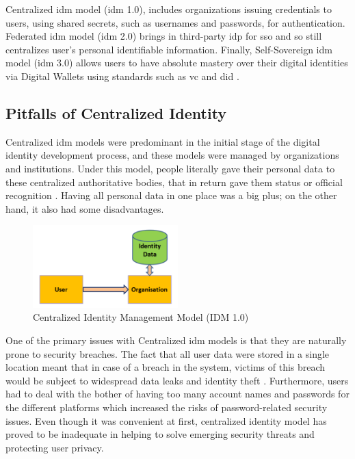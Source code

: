 Centralized \gls{idm} model (\gls{idm} 1.0), includes organizations issuing credentials to users, using shared secrets, such as usernames and passwords, for authentication. 
Federated \gls{idm} model (\gls{idm} 2.0) brings in third-party \gls{idp} for \gls{sso} and so still centralizes user's personal identifiable information. Finally, 
Self-Sovereign \gls{idm} model (\gls{idm} 3.0) allows users to have absolute mastery over their digital identities via Digital Wallets using standards such as 
\gls{vc} and \gls{did} \cite{9272212}.

\subsection{Pitfalls of Centralized Identity}

Centralized \gls{idm} models were predominant in the initial stage of the digital identity development process, and these models were managed by 
organizations and institutions. Under this model, people literally gave their personal data to these centralized authoritative bodies, that in return gave them status or 
official recognition \cite{9695553}. Having all personal data in one place was a big plus; on the other hand, it also had some disadvantages.

\begin{figure}[h]  
  \centering
  \includegraphics[width=0.5\textwidth]{Images/c3_2.png} 
  \caption{Centralized Identity Management Model (IDM 1.0)}
\end{figure}

One of the primary issues with Centralized \gls{idm} models is that they are naturally prone to security breaches. The fact that all user data were stored in a single 
location meant that in case of a breach in the system, victims of this breach would be subject to widespread data leaks and identity theft \cite{businessreporter}. 
Furthermore, users had to deal with the bother of having too many account names and passwords for the different platforms which increased the risks of password-related 
security issues. Even though it was convenient at first, centralized identity model has proved to be inadequate in helping to solve emerging security threats and 
protecting user privacy.

